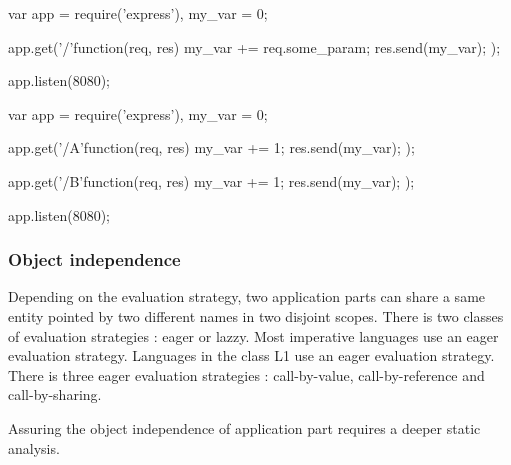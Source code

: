 \begin{code}[js, %
             caption={The upstream application doesn't read nor write the variable}, %
             label={lst:store}] %
var app = require('express'),
    my_var = 0;

app.get('/'function(req, res){
  my_var += req.some_param;
  res.send(my_var);
});

app.listen(8080);
\end{code}

\begin{code}[js, %
             caption={Two application parts write on the same variable}, %
             label={lst:dependent}] %
var app = require('express'),
    my_var = 0;

app.get('/A'function(req, res){
  my_var += 1;
  res.send(my_var);
});

app.get('/B'function(req, res){
  my_var += 1;
  res.send(my_var);
});

app.listen(8080);
\end{code}






\subsubsection{Object independence}

Depending on the evaluation strategy, two application parts can share a same entity pointed by two different names in two disjoint scopes.
There is two classes of evaluation strategies : eager or lazzy.
Most imperative languages use an eager evaluation strategy.
Languages in the class L1 use an eager evaluation strategy.
There is three eager evaluation strategies : call-by-value, call-by-reference and call-by-sharing.

Assuring the object independence of application part requires a deeper static analysis\cite{Cytron1991,Andersen1994,Abramsky1987,Cousot1977,Agesen1995,Ferrante1987,Horwitz1990,Logozzo2010,Rosen1988,Cousot1979,Gardner2012,Aiken1993,Aiken1991,Jensen2011,Jensen2012,Kam1977,Maffeis2008,Agesen1994,Richards2011,Anderson2005,Cytron1989,Jones2003,Thiemann2005,Tip1995,Sridharan2009,Agrawal1990,Alpern1988,Furr2009,Hackett2012,Jensen2009,Richards2010,Jang2009}.




